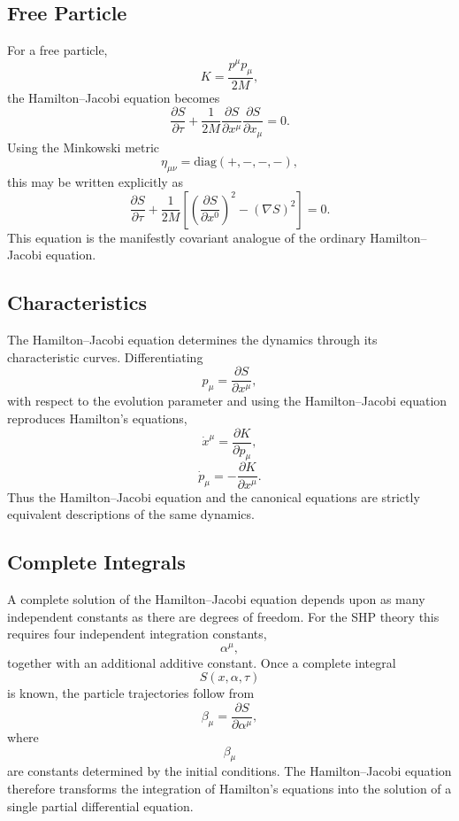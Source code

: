 \subsection{Free Particle}
For a free particle,
\[K=\frac{p^\mu p_\mu}{2M},\]
the Hamilton--Jacobi equation becomes
\[\boxed{\frac{\partial S}{\partial\tau}+\frac{1}{2M}
\frac{\partial S}{\partial x^\mu}
\frac{\partial S}{\partial x_\mu}=0.}\]
Using the Minkowski metric
\[\eta_{\mu\nu}=\mathrm{diag}(+,-,-,-),\]
this may be written explicitly as
\[\frac{\partial S}{\partial\tau}+
\frac{1}{2M}\left[\left(\frac{\partial S}{\partial x^0}\right)^2-
\left(\nabla S\right)^2\right]=0.\]
This equation is the manifestly covariant analogue of the ordinary
Hamilton--Jacobi equation.
\subsection{Characteristics}
The Hamilton--Jacobi equation determines the dynamics through its
characteristic curves.
Differentiating
\[p_\mu=\frac{\partial S}{\partial x^\mu},\]
with respect to the evolution parameter and using the Hamilton--Jacobi
equation reproduces Hamilton's equations,
\[\dot x^\mu=\frac{\partial K}{\partial p_\mu},\]
\[\dot p_\mu=-\frac{\partial K}{\partial x^\mu}.\]
Thus the Hamilton--Jacobi equation and the canonical equations are
strictly equivalent descriptions of the same dynamics.
\subsection{Complete Integrals}
A complete solution of the Hamilton--Jacobi equation depends upon as
many independent constants as there are degrees of freedom.
For the SHP theory this requires four independent integration constants,
\[\alpha^\mu,\]
together with an additional additive constant.
Once a complete integral
\[S(x,\alpha,\tau)\]
is known, the particle trajectories follow from
\[\beta_\mu=\frac{\partial S}{\partial\alpha^\mu},\]
where
\[\beta_\mu\]
are constants determined by the initial conditions.
The Hamilton--Jacobi equation therefore transforms the integration of
Hamilton's equations into the solution of a single partial differential
equation.
